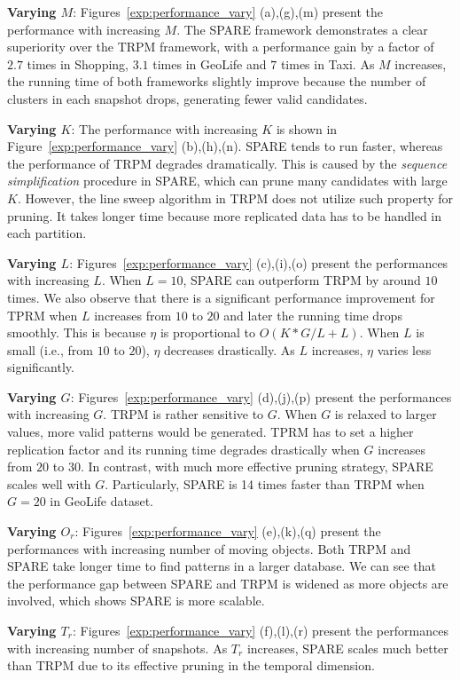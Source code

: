 \textbf{Varying $M$}: Figures~\ref{exp:performance_vary} (a),(g),(m)
present the performance with increasing $M$. The SPARE framework demonstrates a clear superiority over the TRPM framework, with 
a performance gain by a factor of  $2.7$ times in Shopping, $3.1$ times in GeoLife and
$7$ times in Taxi. As $M$ increases, the running time of both frameworks slightly improve because the number of clusters in each snapshot drops, generating fewer valid candidates.

\textbf{Varying $K$}: The performance with increasing $K$ is shown in Figure~\ref{exp:performance_vary} (b),(h),(n).  SPARE tends to run faster, whereas the performance of TRPM degrades dramatically. This is caused by the \emph{sequence simplification} procedure in SPARE, which can prune many candidates with large $K$. However, the line sweep algorithm in TRPM does not utilize such property for pruning. It takes longer time because more replicated data has to be handled in each partition.

\textbf{Varying $L$}: Figures~\ref{exp:performance_vary} (c),(i),(o) present the performances with increasing $L$. When $L=10$, SPARE can outperform TRPM by around $10$ times. We also observe that there is a significant performance improvement for TPRM when $L$ increases from $10$ to $20$ and later the running time drops smoothly. 
This is because $\eta$ is proportional to $O(K*G/L+L)$. When $L$ is small (i.e., from $10$ to $20$),
$\eta$ decreases drastically. As $L$ increases, $\eta$ varies less significantly.

\textbf{Varying $G$}: Figures~\ref{exp:performance_vary} (d),(j),(p) present the performances with increasing $G$.  TRPM is rather sensitive to $G$. When $G$ is relaxed to larger values, more valid patterns would be generated. TPRM has to set a higher replication factor and its running time degrades drastically when $G$ increases from $20$ to $30$. In contrast, with much more effective pruning strategy, SPARE scales well with $G$. Particularly, SPARE is 14 times faster than TRPM when $G=20$ in GeoLife dataset.

\textbf{Varying $O_r$}: Figures~\ref{exp:performance_vary} (e),(k),(q) present the performances with increasing number of moving objects. Both TRPM and SPARE take longer time to find patterns in a larger database. We can see that the performance gap between SPARE and TRPM is widened as more objects are involved, which shows SPARE is more scalable.

\textbf{Varying $T_r$}: Figures~\ref{exp:performance_vary} (f),(l),(r) present 
the performances with increasing number of snapshots. As $T_r$ increases, SPARE scales much better than TRPM due to its effective pruning in the temporal dimension. 

